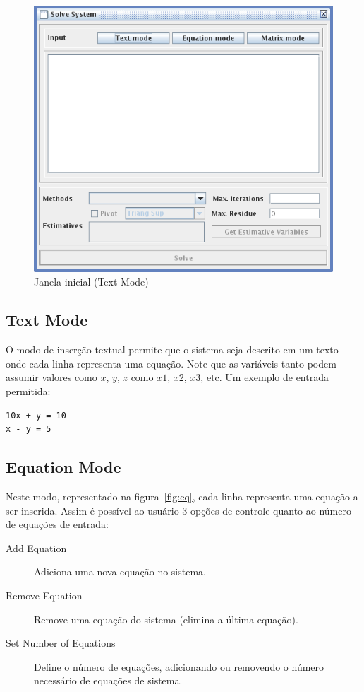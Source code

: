 \documentclass[a4paper,10pt]{report}
\begin{document}
\begin{figure}[ht]
 \centering
 \includegraphics[scale=0.8, bb=0 0 363 323]{screen-2-text.png}
 \caption{Janela inicial (Text Mode)}
 \label{fig:input}
\end{figure}

\subsection{Text Mode}

O modo de inserção textual permite que o sistema seja descrito em um texto onde cada linha representa uma equação. Note que as variáveis tanto podem assumir valores como $x$, $y$, $z$ como $x1$, $x2$, $x3$, etc. Um exemplo de entrada permitida:

\begin{verbatim}
10x + y = 10
x - y = 5
\end{verbatim} 

\subsection{Equation Mode}

Neste modo, representado na figura~\ref{fig:eq}, cada linha representa uma equação a ser inserida. Assim é possível ao usuário 3 opções de controle quanto ao número de equações de entrada:

\begin{description}
 \item[Add Equation] Adiciona uma nova equação no sistema.
 \item[Remove Equation] Remove uma equação do sistema (elimina a última equação).
 \item[Set Number of Equations] Define o número de equações, adicionando ou removendo o número necessário de equações de sistema.
 \end{description}
\end{document}
